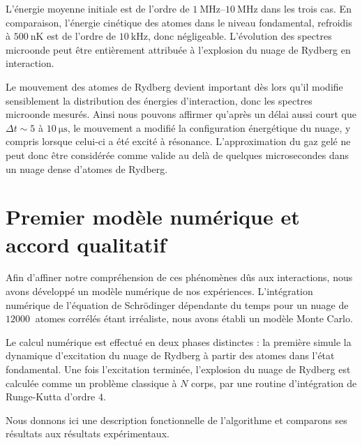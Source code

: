 %
L'énergie moyenne initiale est de l'ordre de $\SIrange{1}{10}{\MHz}$ dans les trois cas.
En comparaison, l'énergie cinétique des atomes dans le niveau fondamental, refroidis à $\SI{500}{\nano\K}$ est de l'ordre de $\SI{10}{\kHz}$, donc négligeable.
L'évolution des spectres microonde peut être entièrement attribuée à l'explosion du nuage de Rydberg en interaction.

Le mouvement des atomes de Rydberg devient important dès lors qu'il modifie sensiblement la distribution des énergies d'interaction, donc les spectres microonde mesurés.
Ainsi nous pouvons affirmer qu'après un délai aussi court que $\Delta t \sim \num{5}$ à $\SI{10}{\us}$, le mouvement a modifié la configuration énergétique du nuage, y compris lorsque celui-ci a été excité à résonance.
L'approximation du \og gaz gelé \fg{} ne peut donc être considérée comme valide au delà de quelques microsecondes dans un nuage dense d'atomes de Rydberg.


\section{Premier modèle numérique et accord qualitatif}
\noindent Afin d'affiner notre compréhension de ces phénomènes dûs aux interactions, nous avons développé un modèle numérique de nos expériences.
L'intégration numérique de l'équation de Schrödinger dépendante du temps pour un nuage de $\SI{12000}{}$ atomes corrélés étant irréaliste, nous avons établi un modèle Monte Carlo.

Le calcul numérique est effectué en deux phases distinctes : la première simule la dynamique d'excitation du nuage de Rydberg à partir des atomes dans l'état fondamental.
Une fois l'excitation terminée, l'explosion du nuage de Rydberg est calculée comme un problème classique à $N$ corps, par une routine d'intégration de Runge-Kutta d'ordre $4$.

Nous donnons ici une description fonctionnelle de l'algorithme et comparons ses résultats aux résultats expérimentaux.

